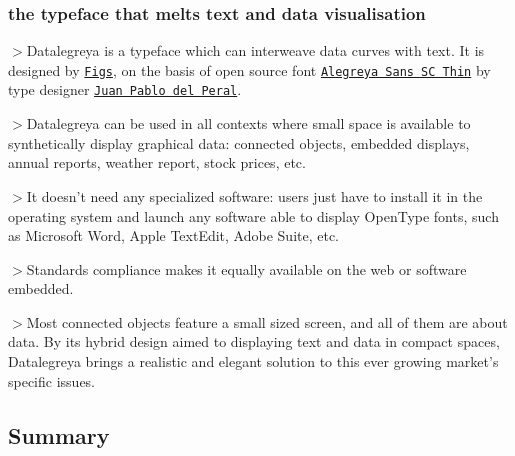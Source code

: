 \subsubsection*{the typeface that melts text and data visualisation}



$>$Datalegreya is a typeface which can interweave data curves with text. It is designed by \href{http://figs-lab.com}{\tt Figs}, on the basis of open source font \href{https://fonts.google.com/specimen/Alegreya+Sans+SC}{\tt Alegreya Sans SC Thin} by type designer \href{https://twitter.com/juandelperal}{\tt Juan Pablo del Peral}.

$>$Datalegreya can be used in all contexts where small space is available to synthetically display graphical data\+: connected objects, embedded displays, annual reports, weather report, stock prices, etc.

$>$It doesn’t need any specialized software\+: users just have to install it in the operating system and launch any software able to display Open\+Type fonts, such as Microsoft Word, Apple Text\+Edit, Adobe Suite, etc.

$>$Standards compliance makes it equally available on the web or software embedded.

$>$Most connected objects feature a small sized screen, and all of them are about data. By its hybrid design aimed to displaying text and data in compact spaces, Datalegreya brings a realistic and elegant solution to this ever growing market’s specific issues.

\subsection*{Summary}


